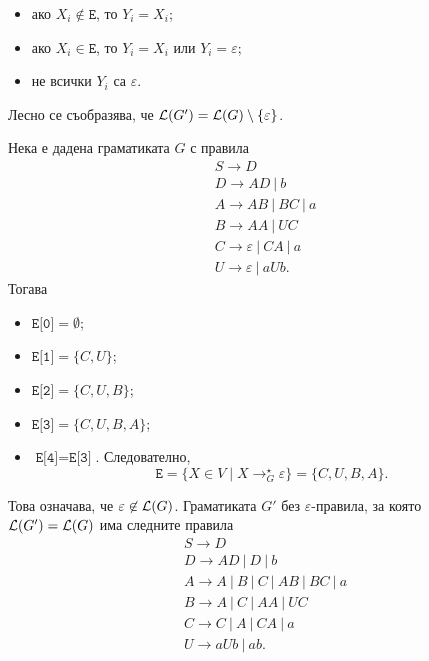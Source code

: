 \begin{hint}
\begin{enumerate}[1)]
    \begin{itemize}[-]
    \item 
      ако $X_i \not\in \texttt{E}$, то $Y_i = X_i$;
    \item
      ако $X_i \in \texttt{E}$, то $Y_i = X_i$ или $Y_i = \varepsilon$;
    \item
      не всички $Y_i$ са $\varepsilon$.
    \end{itemize}
    Лесно се съобразява, че $\mathcal{L}(G') = \mathcal{L}(G) \setminus \{\varepsilon\}$.
  \end{enumerate}
\end{hint}

\begin{example}
  Нека е дадена граматиката $G$ с правила
  \begin{align*}
    & S \to D\\
    & D \to AD\ |\ b\\
    & A \to AB\ |\ BC\ |\ a\\
    & B \to AA\ |\ UC\\
    & C \to \varepsilon\ |\ CA\ |\ a\\
    & U \to \varepsilon\ |\ aUb.
  \end{align*}
  Тогава
  \begin{itemize}[-]
  \item
    $\texttt{E[0]} = \emptyset$;
  \item
    $\texttt{E[1]} = \{C,U\}$;
  \item
    $\texttt{E[2]} = \{C,U,B\}$;
  \item
    $\texttt{E[3]} = \{C,U,B,A\}$;
  \item
    $\texttt{E[4]} = \texttt{E[3]}$. Следователно,
    \[\texttt{E} = \{X \in V \mid X \rightarrow^\star_G \varepsilon\} = \{C,U,B,A\}.\]
  \end{itemize}
  
  Това означава, че $\varepsilon \not\in \mathcal{L}(G)$.
  Граматиката $G'$ без $\varepsilon$-правила, за която $\mathcal{L}(G') = \mathcal{L}(G)$ има следните правила
  \begin{align*}
    & S \to D \\
    & D\to AD\ |\ D\ |\ b \\
    & A \to A\ |\ B\ |\ C\ |\ AB\ |\ BC\ |\ a \\
    & B\to A\ |\ C\ |\ AA\ |\ UC\\
    & C \to C\ |\ A\ |\ CA\ |\ a\\
    & U \to aUb\ |\ ab.
  \end{align*}
\end{example}

